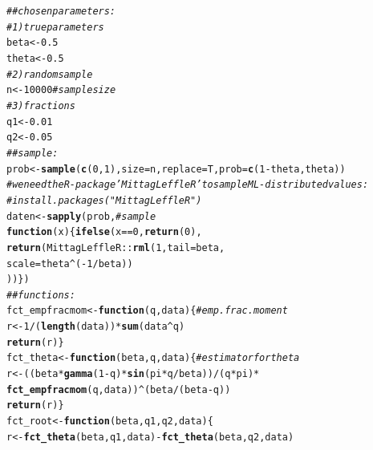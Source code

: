 \documentclass[10pt, a4paper]{article}\usepackage[]{graphicx}\usepackage[]{color}
\makeatletter
\newcommand{\hlnum}[1]{\textcolor[rgb]{0.686,0.059,0.569}{#1}}%
\newcommand{\hlcom}[1]{\textcolor[rgb]{0.678,0.584,0.686}{\textit{#1}}}%
\newcommand{\hlopt}[1]{\textcolor[rgb]{0,0,0}{#1}}%
\newcommand{\hlstd}[1]{\textcolor[rgb]{0.345,0.345,0.345}{#1}}%
\newcommand{\hlkwa}[1]{\textcolor[rgb]{0.161,0.373,0.58}{\textbf{#1}}}%
\newcommand{\hlkwb}[1]{\textcolor[rgb]{0.69,0.353,0.396}{#1}}%
\newcommand{\hlkwc}[1]{\textcolor[rgb]{0.333,0.667,0.333}{#1}}%
\newcommand{\hlkwd}[1]{\textcolor[rgb]{0.737,0.353,0.396}{\textbf{#1}}}%
\newenvironment{kframe}{%
 \def\at@end@of@kframe{}%
 \ifinner\ifhmode%
  \def\at@end@of@kframe{\end{minipage}}%
  \begin{minipage}{\columnwidth}%
 \fi\fi%
 \def\FrameCommand##1{\hskip\@totalleftmargin \hskip-\fboxsep
 \colorbox{shadecolor}{##1}\hskip-\fboxsep
     \hskip-\linewidth \hskip-\@totalleftmargin \hskip\columnwidth}%
 \MakeFramed {\advance\hsize-\width
   \@totalleftmargin\z@ \linewidth\hsize
   \@setminipage}}%
 {\par\unskip\endMakeFramed%
 \at@end@of@kframe}
\newenvironment{knitrout}{}{} %
\makeatother
\begin{document}
\begin{knitrout}
\color{fgcolor}\begin{kframe}
\begin{alltt}
\hlcom{## chosen parameters:}
\hlcom{# 1) true parameters}
\hlstd{beta} \hlkwb{<-} \hlnum{0.5}
\hlstd{theta} \hlkwb{<-} \hlnum{0.5}
\hlcom{# 2) random sample}
\hlstd{n} \hlkwb{<-} \hlnum{10000}                                   \hlcom{# sample size}
\hlcom{# 3) fractions}
\hlstd{q1} \hlkwb{<-} \hlnum{0.01}
\hlstd{q2} \hlkwb{<-} \hlnum{0.05}
\hlcom{## sample:}
\hlstd{prob} \hlkwb{<-} \hlkwd{sample}\hlstd{(} \hlkwd{c}\hlstd{(}\hlnum{0}\hlstd{,}\hlnum{1}\hlstd{) ,} \hlkwc{size} \hlstd{= n ,} \hlkwc{replace} \hlstd{= T ,} \hlkwc{prob} \hlstd{=} \hlkwd{c}\hlstd{(}\hlnum{1}\hlopt{-}\hlstd{theta , theta))}
\hlcom{# we need the R-package 'MittagLeffleR' to sample ML-distributed values:}
\hlcom{# install.packages("MittagLeffleR") }
\hlstd{daten} \hlkwb{<-} \hlkwd{sapply}\hlstd{(prob ,}                       \hlcom{# sample}
                \hlkwa{function}\hlstd{(}\hlkwc{x}\hlstd{)\{} \hlkwd{ifelse}\hlstd{( x} \hlopt{==} \hlnum{0} \hlstd{,} \hlkwd{return}\hlstd{(}\hlnum{0}\hlstd{) ,}
                        \hlkwd{return}\hlstd{( MittagLeffleR}\hlopt{::}\hlkwd{rml}\hlstd{(}\hlnum{1} \hlstd{,} \hlkwc{tail} \hlstd{= beta ,}
                        \hlkwc{scale} \hlstd{= theta}\hlopt{^}\hlstd{(}\hlopt{-}\hlnum{1}\hlopt{/}\hlstd{beta))}
                        \hlstd{) ) \} )}
\hlcom{## functions:}
\hlstd{fct_empfracmom} \hlkwb{<-} \hlkwa{function}\hlstd{(} \hlkwc{q} \hlstd{,} \hlkwc{data} \hlstd{)\{}       \hlcom{# emp. frac. moment}
                \hlstd{r} \hlkwb{<-} \hlnum{1}\hlopt{/}\hlstd{(}\hlkwd{length}\hlstd{(data))}\hlopt{*}\hlkwd{sum}\hlstd{(data}\hlopt{^}\hlstd{q)}
                \hlkwd{return}\hlstd{(r)       \}}
\hlstd{fct_theta} \hlkwb{<-} \hlkwa{function}\hlstd{(} \hlkwc{beta} \hlstd{,} \hlkwc{q} \hlstd{,} \hlkwc{data} \hlstd{)\{}     \hlcom{# estimator for theta}
                \hlstd{r} \hlkwb{<-} \hlstd{( ( beta}\hlopt{*}\hlkwd{gamma}\hlstd{(}\hlnum{1}\hlopt{-}\hlstd{q)}\hlopt{*}\hlkwd{sin}\hlstd{(pi}\hlopt{*}\hlstd{q}\hlopt{/}\hlstd{beta) )}\hlopt{/}\hlstd{( q}\hlopt{*}\hlstd{pi )}\hlopt{*}
                \hlkwd{fct_empfracmom}\hlstd{(q , data) )}\hlopt{^}\hlstd{(beta}\hlopt{/}\hlstd{(beta}\hlopt{-}\hlstd{q))}
                \hlkwd{return}\hlstd{(r)               \}}
\hlstd{fct_root} \hlkwb{<-} \hlkwa{function}\hlstd{(} \hlkwc{beta} \hlstd{,} \hlkwc{q1} \hlstd{,} \hlkwc{q2} \hlstd{,} \hlkwc{data}\hlstd{)\{}
                \hlstd{r} \hlkwb{<-} \hlkwd{fct_theta}\hlstd{( beta , q1 , data)} \hlopt{-} \hlkwd{fct_theta}\hlstd{( beta , q2 , data)}

\end{alltt}
\end{kframe}
\end{knitrout}
\end{document}
